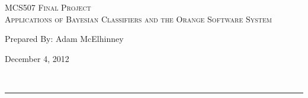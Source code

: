 \begin{center}
\textsc{\Large MCS507 Final Project\\}
\textsc{Applications of Bayesian Classifiers and the Orange Software System}
\end{center}
\begin{minipage}{0.6\textwidth}
\begin{flushleft}
	Prepared By: Adam McElhinney
\end{flushleft}
\end{minipage}
\begin{minipage}{0.39\textwidth}
\begin{flushright}
	December 4, 2012
\end{flushright}
\end{minipage}\\[0.01in]
\hrule